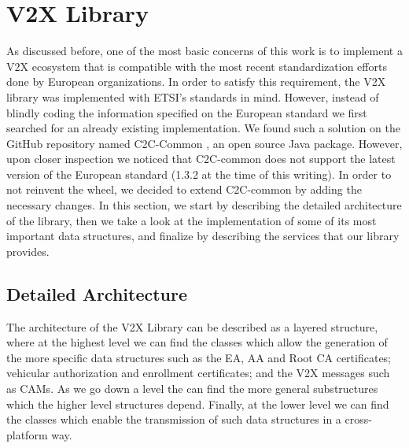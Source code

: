 \section{V2X Library}
As discussed before, one of the most basic concerns of this work is to implement a V2X ecosystem that is compatible with the most recent standardization efforts done by European organizations. In order to satisfy this requirement, the V2X library was implemented with ETSI’s standards in mind.
However, instead of blindly coding the information specified on the European standard we first searched for an already existing implementation. We found such a solution on the GitHub repository named C2C-Common \cite{c2c-common}, an open source Java package. However, upon closer inspection we noticed that C2C-common does not support the latest version of the European standard (1.3.2 at the time of this writing). In order to not reinvent the wheel, we decided to extend C2C-common by adding the necessary changes. In this section, we start by describing the detailed architecture of the library, then we take a look at the implementation of some of its most important data structures, and finalize by describing the services that our library provides. 

\subsection{Detailed Architecture}
The architecture of the V2X Library can be described as a layered structure, where at the highest level we can find the classes which allow the generation of the more specific data structures such as the EA, AA and Root CA certificates; vehicular authorization and enrollment certificates; and the V2X messages such as CAMs. As we go down a level the can find the more general substructures which the higher level structures depend. Finally, at the lower level we can find the classes which enable the transmission of such data structures in a cross-platform way.

